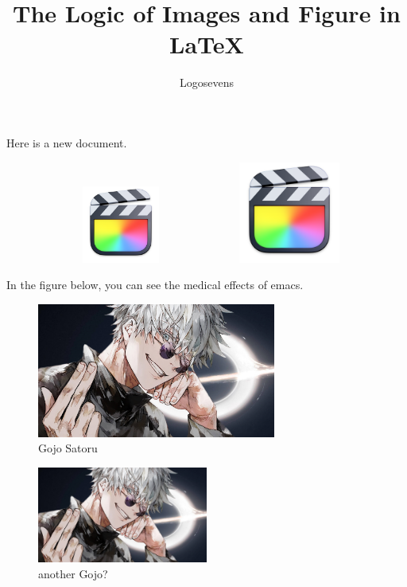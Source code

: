 \documentclass{article}
\author{Logosevens}
\title{The Logic of Images and Figure in {\LaTeX}}
\begin{document}
\maketitle

Here is a new document.

\begin{center}
\includegraphics[width=3in,height=1in, keepaspectratio]{fcpx.png}
\includegraphics[width=0.25\textwidth, angle=45]{fcpx.png}
\end{center}

\blindtext
\blindtext
\blindtext

In the figure below, you can see the medical effects of emacs.

\blindtext

\begin{figure}[h]
\centering

\includegraphics[width=0.7\textwidth]{gojo.jpeg}

\caption{Gojo Satoru}
\end{figure}

\blindtext
\begin{figure}
\includegraphics[width=0.5\textwidth]{gojo.jpeg}
\caption{another Gojo?\label{latexpic}}
\end{figure}
\end{document}
